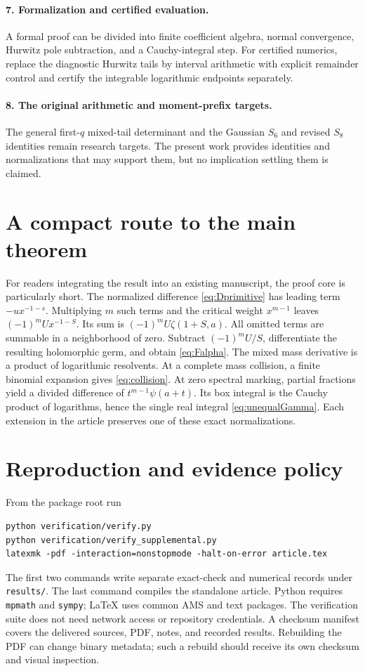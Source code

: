 \documentclass[11pt]{article}
\numberwithin{equation}{section}
\theoremstyle{definition}\newtheorem{definition}[theorem]{Definition}
\theoremstyle{remark}\newtheorem{remark}[theorem]{Remark}
\begin{document}
\paragraph{7. Formalization and certified evaluation.}
A formal proof can be divided into finite coefficient algebra, normal convergence, Hurwitz pole subtraction, and a Cauchy-integral step. For certified numerics, replace the diagnostic Hurwitz tails by interval arithmetic with explicit remainder control and certify the integrable logarithmic endpoints separately.

\paragraph{8. The original arithmetic and moment-prefix targets.}
The general first-$q$ mixed-tail determinant and the Gaussian $S_6$ and revised $S_8$ identities remain research targets. The present work provides identities and normalizations that may support them, but no implication settling them is claimed.

\appendix
\section{A compact route to the main theorem}
For readers integrating the result into an existing manuscript, the proof core is particularly short. The normalized difference \eqref{eq:Dprimitive} has leading term $-u x^{-1-s}$. Multiplying $m$ such terms and the critical weight $x^{m-1}$ leaves $(-1)^mU x^{-1-S}$. Its sum is $(-1)^mU\zeta(1+S,a)$. All omitted terms are summable in a neighborhood of zero. Subtract $(-1)^mU/S$, differentiate the resulting holomorphic germ, and obtain \eqref{eq:Falpha}. The mixed mass derivative is a product of logarithmic resolvents. At a complete mass collision, a finite binomial expansion gives \eqref{eq:collision}. At zero spectral marking, partial fractions yield a divided difference of $t^{m-1}\psi(a+t)$. Its box integral is the Cauchy product of logarithms, hence the single real integral \eqref{eq:unequalGamma}. Each extension in the article preserves one of these exact normalizations.

\section{Reproduction and evidence policy}
From the package root run
\begin{verbatim}
python verification/verify.py
python verification/verify_supplemental.py
latexmk -pdf -interaction=nonstopmode -halt-on-error article.tex
\end{verbatim}
The first two commands write separate exact-check and numerical records under \texttt{results/}. The last command compiles the standalone article. Python requires \texttt{mpmath} and \texttt{sympy}; LaTeX uses common AMS and text packages. The verification suite does not need network access or repository credentials. A checksum manifest covers the delivered sources, PDF, notes, and recorded results. Rebuilding the PDF can change binary metadata; such a rebuild should receive its own checksum and visual inspection.
\end{document}

